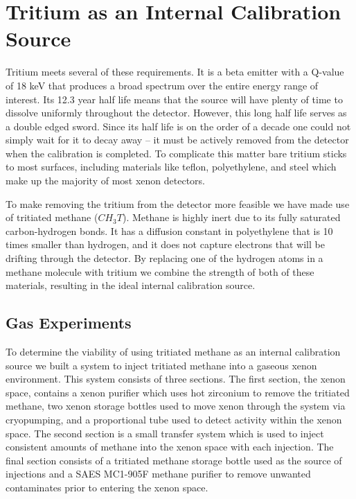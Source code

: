 \documentclass[a4paper,12pt]{article}
\begin{document}
\section{Tritium as an Internal Calibration Source}

Tritium meets several of these requirements.  It is a beta emitter with a Q-value of 18 keV that produces a broad spectrum over the entire energy range of interest.  Its 12.3 year half life means that the source will have plenty of time to dissolve uniformly throughout the detector.  However, this long half life serves as a double edged sword.  Since its half life is on the order of a decade one could not simply wait for it to decay away -- it must be actively removed from the detector when the calibration is completed.  To complicate this matter bare tritium sticks to most surfaces, including materials like teflon, polyethylene, and steel which make up the majority of most xenon detectors.

To make removing the tritium from the detector more feasible we have made use of tritiated methane ($ CH_3T $).  Methane is highly inert due to its fully saturated carbon-hydrogen bonds.  It has a diffusion constant in polyethylene that is 10 times smaller than hydrogen, and it does not capture electrons that will be drifting through the detector.  By replacing one of the hydrogen atoms in a methane molecule with tritium we combine the strength of both of these materials, resulting in the ideal internal calibration source.


\subsection{Gas Experiments}

To determine the viability of using tritiated methane as an internal calibration source we built a system to inject tritiated methane into a gaseous xenon environment.  This system consists of three sections.  The first section, the xenon space, contains a xenon purifier which uses hot zirconium to remove the tritiated methane, two xenon storage bottles used to move xenon through the system via cryopumping, and a proportional tube used to detect activity within the xenon space.  The second section is a small transfer system which is used to inject consistent amounts of methane into the xenon space with each injection.  The final section consists of a tritiated methane storage bottle used as the source of injections and a SAES MC1-905F methane purifier to remove unwanted contaminates prior to entering the xenon space.
\end{document}
